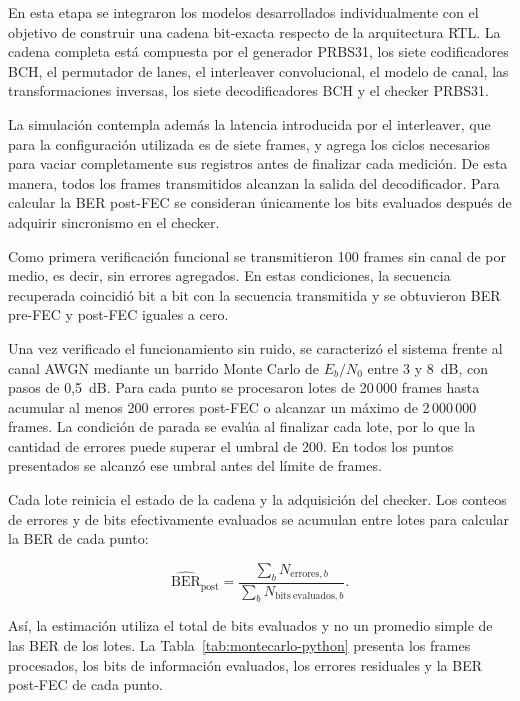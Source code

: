 \documentclass[10pt,a4paper]{article}
\begin{document}
En esta etapa se integraron los modelos desarrollados individualmente con el
objetivo de construir una cadena bit-exacta respecto de la arquitectura RTL.
La cadena completa está compuesta por el generador PRBS31, los siete
codificadores BCH, el permutador de lanes, el interleaver convolucional, el
modelo de canal, las transformaciones inversas, los siete decodificadores BCH
y el checker PRBS31.

La simulación contempla además la latencia introducida por el interleaver, que
para la configuración utilizada es de siete frames, y agrega los ciclos
necesarios para vaciar completamente sus registros antes de finalizar cada
medición. De esta manera, todos los frames transmitidos alcanzan la salida
del decodificador. Para calcular la BER post-FEC se consideran únicamente
los bits evaluados después de adquirir sincronismo en el checker.

Como primera verificación funcional se transmitieron 100 frames sin canal
de por medio, es decir, sin errores agregados. En estas condiciones, la 
secuencia recuperada coincidió bit a bit con la secuencia transmitida y 
se obtuvieron BER pre-FEC y post-FEC iguales a cero.

Una vez verificado el funcionamiento sin ruido, se caracterizó el sistema
frente al canal AWGN mediante un barrido Monte Carlo de $E_b/N_0$ entre
3 y 8~dB, con pasos de 0,5~dB. Para cada punto se procesaron lotes de
20\,000 frames hasta acumular al menos 200 errores post-FEC o alcanzar
un máximo de 2\,000\,000 frames. La condición de parada se evalúa al
finalizar cada lote, por lo que la cantidad de errores puede superar
el umbral de 200. En todos los puntos presentados se alcanzó ese umbral
antes del límite de frames.

Cada lote reinicia el estado de la cadena y la adquisición del checker.
Los conteos de errores y de bits efectivamente evaluados se acumulan
entre lotes para calcular la BER de cada punto:

\begin{equation}
    \widehat{\mathrm{BER}}_{\mathrm{post}}
    =\frac{\sum_b N_{\mathrm{errores},b}}
           {\sum_b N_{\mathrm{bits\ evaluados},b}}.
\end{equation}

Así, la estimación utiliza el total de bits evaluados y no un promedio
simple de las BER de los lotes. La Tabla~\ref{tab:montecarlo-python}
presenta los frames procesados, los bits de información evaluados,
los errores residuales y la BER post-FEC de cada punto.
\end{document}

